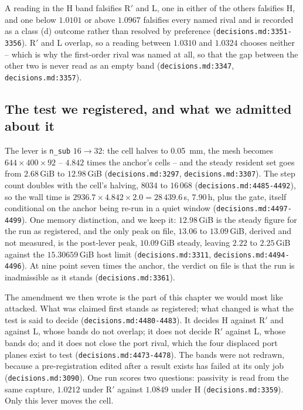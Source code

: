 A reading in the H band falsifies R$'$ and L, one in either of the others falsifies H, and one below $1.0101$ or
above $1.0967$ falsifies every named rival and is recorded as a class (d) outcome rather than resolved by preference
(\texttt{decisions.md:3351-3356}). R$'$ and L overlap, so a reading between $1.0310$ and $1.0324$ chooses neither --
which is why the first-order rival was named at all, so that the gap between the other two is never read as an empty
band (\texttt{decisions.md:3347}, \texttt{decisions.md:3357}).

\subsection{The test we registered, and what we admitted about it}
\label{sec:openproblem-c5}

The lever is \texttt{n\_sub} $16 \to 32$: the cell halves to \SI{0.05}{mm}, the mesh becomes $644\times400\times92$
-- $4.842$ times the anchor's cells -- and the steady resident set goes from $2.68$\,GiB to $12.98$\,GiB
(\texttt{decisions.md:3297}, \texttt{decisions.md:3307}). The step count doubles with the cell's halving, $8034$ to
$16\,068$ (\texttt{decisions.md:4485-4492}), so the wall time is $2936.7 \times 4.842 \times 2.0 = 28\,439.6$\,s,
$7.90$\,h, plus the gate, itself conditional on the anchor being re-run in a quiet window
(\texttt{decisions.md:4497-4499}). One memory distinction, and we keep it: $12.98$\,GiB is the steady figure for
the run as registered, and the only peak on file, $13.06$ to $13.09$\,GiB, derived and not measured, is the
post-lever peak, $10.09$\,GiB steady, leaving $2.22$ to $2.25$\,GiB against the $15.30659$\,GiB host limit
(\texttt{decisions.md:3311}, \texttt{decisions.md:4494-4496}). At nine point seven times the anchor, the verdict on
file is that the run is inadmissible as it stands (\texttt{decisions.md:3361}).

The amendment we then wrote is the part of this chapter we would most like attacked. What was claimed first stands
as registered; what changed is what the test is said to decide (\texttt{decisions.md:4480-4483}). It decides H
against R$'$ and against L, whose bands do not overlap; it does not decide R$'$ against L, whose bands do; and it
does not close the port rival, which the four displaced port planes exist to test
(\texttt{decisions.md:4473-4478}). The bands were not redrawn, because a pre-registration edited after a result
exists has failed at its only job (\texttt{decisions.md:3090}). One run scores two questions: passivity is read
from the same capture, $1.0212$ under R$'$ against $1.0849$ under H (\texttt{decisions.md:3359}). Only this lever
moves the cell.

